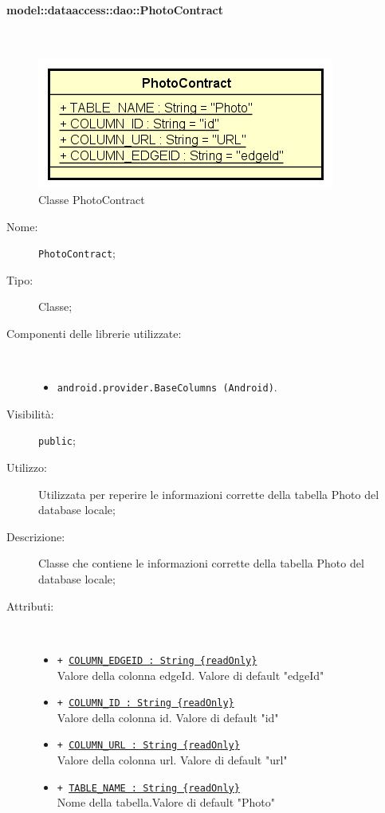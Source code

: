 \documentclass[../DefinizioneDiProdotto.tex]{subfiles}
\begin{document}
\paragraph{model::dataaccess::dao::PhotoContract}
\
\begin{figure}[H]
	\centering
	\includegraphics[width=\maxwidth]{img/PhotoContract.png}
	\caption{Classe PhotoContract}\label{fig:model::dataaccess::dao::PhotoContract} 
\end{figure}
\begin{description}
	\item[Nome:] \texttt{PhotoContract};
	\item[Tipo:] Classe;
	\item[Componenti delle librerie utilizzate:] \
	\begin{itemize}
		\item \texttt{android.provider.BaseColumns (Android)}.
		
	\end{itemize}
	\item[Visibilità:] \texttt{public};
	\item[Utilizzo:] Utilizzata per reperire le informazioni corrette della tabella Photo del database locale;
	\item[Descrizione:] Classe che contiene le informazioni corrette della tabella Photo del database locale;
	\item[Attributi:] \
	\begin{itemize}
		\item \texttt{+ \underline{COLUMN\_EDGEID : String \{readOnly\}}}\\
		Valore della colonna edgeId. Valore di default "edgeId"
		
		\item \texttt{+ \underline{COLUMN\_ID : String \{readOnly\}}}\\
		Valore della colonna id. Valore di default "id"
		
		\item \texttt{+ \underline{COLUMN\_URL : String \{readOnly\}}}\\
		Valore della colonna url. Valore di default "url"
		
		\item \texttt{+ \underline{TABLE\_NAME : String \{readOnly\}}}\\
		Nome della tabella.Valore di default "Photo"
		
	\end{itemize}
\end{description}
\end{document}
